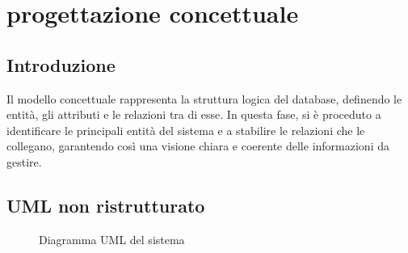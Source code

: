 \section{progettazione concettuale}
\subsection{Introduzione}
Il modello concettuale rappresenta la struttura logica del database, definendo le entità, gli attributi e le relazioni tra di esse. In questa fase, si è proceduto a identificare le principali entità del sistema e a stabilire le relazioni che le collegano, garantendo così una visione chiara e coerente delle informazioni da gestire.
\subsection{UML non ristrutturato}
\begin{figure}[H]
    \noindent{}
    \caption{Diagramma UML del sistema}
\end{figure}
